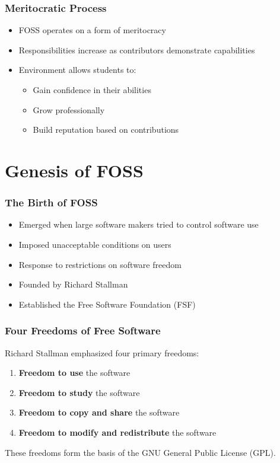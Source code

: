 \documentclass[aspectratio=169]{beamer}
\begin{document}
\begin{frame}
\frametitle{Meritocratic Process}
\begin{itemize}
\item FOSS operates on a form of meritocracy
\item Responsibilities increase as contributors demonstrate capabilities
\item Environment allows students to:
    \begin{itemize}
    \item Gain confidence in their abilities
    \item Grow professionally
    \item Build reputation based on contributions
    \end{itemize}
\end{itemize}
\end{frame}

\section{Genesis of FOSS}

\begin{frame}
\frametitle{The Birth of FOSS}
\begin{itemize}
\item Emerged when large software makers tried to control software use
\item Imposed unacceptable conditions on users
\item Response to restrictions on software freedom
\item Founded by Richard Stallman
\item Established the Free Software Foundation (FSF)
\end{itemize}
\end{frame}

\begin{frame}
\frametitle{Four Freedoms of Free Software}
Richard Stallman emphasized four primary freedoms:
\begin{enumerate}
\item \textbf{Freedom to use} the software
\item \textbf{Freedom to study} the software
\item \textbf{Freedom to copy and share} the software
\item \textbf{Freedom to modify and redistribute} the software
\end{enumerate}

These freedoms form the basis of the GNU General Public License (GPL).
\end{frame}
\end{document}
